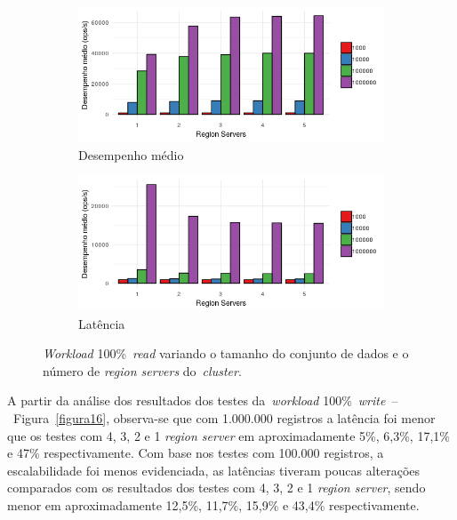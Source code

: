 \documentclass[12pt]{article}
\begin{document}
\begin{figure}[!ht]
    \centering
    \begin{subfigure}[b]{0.49\textwidth}
        \centering
        \includegraphics[width=\textwidth]{images/figura17}
        \caption{Desempenho médio}
        \label{figura17}
    \end{subfigure}
        \hfill
    \begin{subfigure}[b]{0.49\textwidth}  
        \centering 
        \includegraphics[width=\textwidth]{images/figura18}
        \caption{Latência}%
        \label{figura18}
    \end{subfigure}
    \caption{\emph{Workload} 100\%~\emph{read} variando o tamanho do conjunto de dados e o número de \emph{region servers} do~\emph{cluster}.}
\end{figure}

A partir da análise dos resultados dos testes da~\emph{workload} 100\%~\emph{write}~--~Figura~\ref{figura16}, observa-se que com 1.000.000 registros a latência foi menor que os testes com 4, 3, 2 e 1 \emph{region server} em aproximadamente 5\%, 6,3\%, 17,1\% e 47\% respectivamente. 
Com base nos testes com 100.000 registros, a escalabilidade foi menos evidenciada, as latências tiveram poucas alterações comparados com os resultados dos testes com 4, 3, 2 e 1 \emph{region server}, sendo menor em aproximadamente 12,5\%, 11,7\%, 15,9\% e 43,4\% respectivamente.
\end{document}
